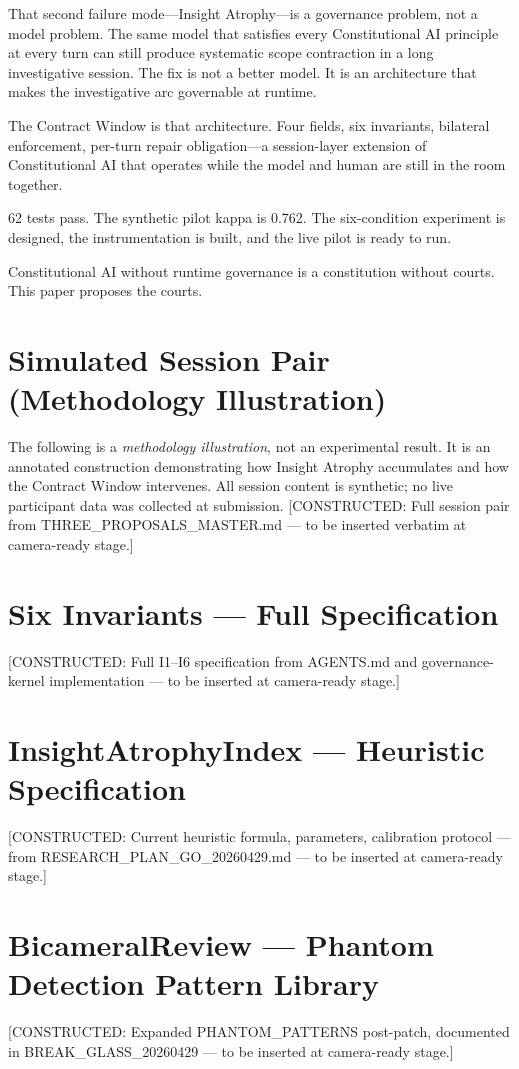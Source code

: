 \documentclass{article}
\newcommand{\cw}{Contract Window\xspace}
\newcommand{\ia}{Insight Atrophy\xspace}
\newcommand{\cai}{Constitutional AI\xspace}
\newcommand{\constructed}[1]{\textcolor{pendingred}{[CONSTRUCTED: #1]}}
\begin{document}
That second failure mode---\ia---is a governance problem, not a model problem.
The same model that satisfies every \cai{} principle at every turn can still
produce systematic scope contraction in a long investigative session. The fix
is not a better model. It is an architecture that makes the investigative arc
governable at runtime.

The \cw{} is that architecture. Four fields, six invariants, bilateral
enforcement, per-turn repair obligation---a session-layer extension of \cai{}
that operates while the model and human are still in the room together.

62 tests pass. The synthetic pilot kappa is 0.762. The six-condition experiment
is designed, the instrumentation is built, and the live pilot is ready to run.

\cai{} without runtime governance is a constitution without courts. This paper
proposes the courts.



\appendix

\section{Simulated Session Pair (Methodology Illustration)}
\label{app:sessions}

The following is a \emph{methodology illustration}, not an experimental result.
It is an annotated construction demonstrating how \ia{} accumulates and how
the \cw{} intervenes. All session content is synthetic; no live participant
data was collected at submission. \constructed{Full session pair from
THREE\_PROPOSALS\_MASTER.md --- to be inserted verbatim at camera-ready stage.}

\section{Six Invariants --- Full Specification}
\label{app:invariants}

\constructed{Full I1--I6 specification from AGENTS.md and governance-kernel
implementation --- to be inserted at camera-ready stage.}

\section{InsightAtrophyIndex --- Heuristic Specification}
\label{app:iai}

\constructed{Current heuristic formula, parameters, calibration protocol ---
from RESEARCH\_PLAN\_GO\_20260429.md --- to be inserted at camera-ready stage.}

\section{BicameralReview --- Phantom Detection Pattern Library}
\label{app:bicameral}

\constructed{Expanded PHANTOM\_PATTERNS post-patch, documented in
BREAK\_GLASS\_20260429 --- to be inserted at camera-ready stage.}
\end{document}
